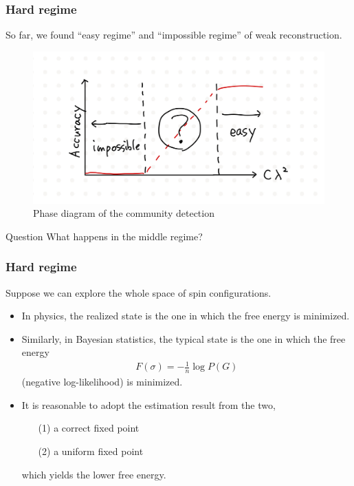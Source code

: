 \documentclass[dvipdfmx,11pt]{beamer}
\begin{document}
\begin{frame}
  \frametitle{Hard regime}
  So far, we found ``easy regime'' and ``impossible regime'' of weak reconstruction.
  \begin{figure}
    \centering
    \includegraphics[width=0.7\linewidth]{figure/phase2.jpeg}
    \caption{Phase diagram of the community detection}
  \end{figure}

  \begin{block}{Question}
    What happens in the middle regime?
  \end{block}

\end{frame}

\begin{frame}
  \frametitle{Hard regime}
  Suppose we can explore the whole space of spin configurations.
  \begin{itemize}
    \item In physics, the realized state is the one in which the \alert{free energy} is minimized.
    \item Similarly, in Bayesian statistics, the typical state is the one in which the free energy
    \begin{align*}
      F(\sigma) = - \frac{1}{n} \log P(G)
    \end{align*}
    (negative log-likelihood) is minimized.
    \item It is reasonable to adopt the estimation result from the two, 
    \begin{itemize}
      \item[(1)] a correct fixed point
      \item[(2)] a uniform fixed point
    \end{itemize} 
    which yields the lower free energy.
  \end{itemize}
\end{frame}
\end{document}
